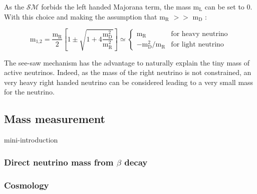 \documentclass[main.tex]{subfiles}
\begin{document}
\smallskip


\NI As the $\mathcal{SM}$ forbids the left handed Majorana term, the mass m$_\text{L}$ can be set to 0. With this choice and making the assumption that m$_\text{R}$ $>>$ m$_\text{D}$ : 


\begin{equation}
\text{m}_{\text{1,2}} = \frac{\text{m}_\text{R}}{\text{2}} \left[\text{1} \pm \sqrt{\text{1} + \text{4} \frac{\text{m}_\text{D}^\text{2}}{\text{m}_\text{R}^\text{2}}} \right] \simeq \left\{ \begin{array}{cc}
\text{m}_\text{R} & \text{for heavy neutrino} \\
- \text{m}_\text{D}^\text{2} / \text{m}_\text{R} & \text{for light neutrino}
\end{array} \right.
\end{equation}


\smallskip


\NI The see-saw mechanism has the advantage to naturally explain the tiny mass of active neutrinos. Indeed, as the mass of the right neutrino is not constrained, an very heavy right handed neutrino can be considered leading to a very small mass for the neutrino.


\FloatBarrier


\subsection{Mass measurement}\label{sec:NeutrinoMassMeasurementExp}


\NI mini-introduction

\subsubsection{Direct neutrino mass from $\beta$ decay}


\subsubsection{Cosmology}


\newpage


\clearpage
\end{document}
